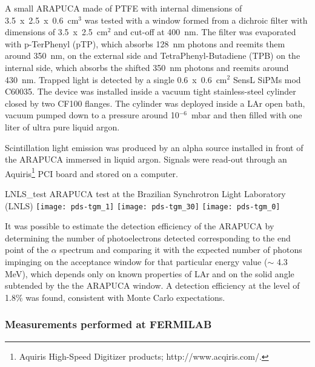 A small ARAPUCA made of PTFE with internal dimensions of 3.5~x~2.5~x~0.6~cm$^3$ was tested with a window formed from a dichroic filter with dimensions of 3.5~x~2.5~cm$^2$ and cut-off at \SI{400}{nm}.
The filter was evaporated with p-TerPhenyl (pTP), which absorbs  \SI{128}{nm} photons and reemits them around  \SI{350}{nm},  on the external side and TetraPhenyl-Butadiene (TPB) on the internal side, which absorbs the shifted \SI{350}{nm} photons and reemits around \SI{430}{nm}. Trapped light is detected by a single 0.6~x~0.6~cm$^2$  SensL SiPMs mod C60035.
The device was installed inside a vacuum tight stainless-steel cylinder closed by two CF100 flanges. The cylinder was deployed inside a LAr open bath, vacuum pumped down to a pressure around  10$^{-6}$~\si{mbar} and then filled with one liter of ultra pure liquid argon. 

Scintillation light emission was produced by an alpha source  installed in front of the ARAPUCA immersed in liquid argon. Signals were read-out through an Aquiris\footnote{Aquiris High-Speed Digitizer products; http://www.acqiris.com/.} PCI board and stored on a computer.

\begin{dunefigure}{LNLS_test}
{ARAPUCA test at the Brazilian Synchrotron Light Laboratory (LNLS)} 
	\texttt{[image: pds-tgm\_1]} \quad
	\texttt{[image: pds-tgm\_30]}\quad
	\texttt{[image: pds-tgm\_0]}
\end{dunefigure}

It was possible to estimate the detection efficiency of the ARAPUCA by 
determining the number of photoelectrons detected corresponding to the end point of the $\alpha$ spectrum 
and comparing it with the expected number of photons impinging on the acceptance window for that 
particular energy value ($\sim$ 4.3 MeV), which depends only on known properties of LAr and on the solid 
angle subtended by the the ARAPUCA window. A detection efficiency at the level of 1.8\% 
was found,  consistent with Monte Carlo expectations.

\subsubsection{Measurements performed at FERMILAB}
\label{subsec:test_fnal}

